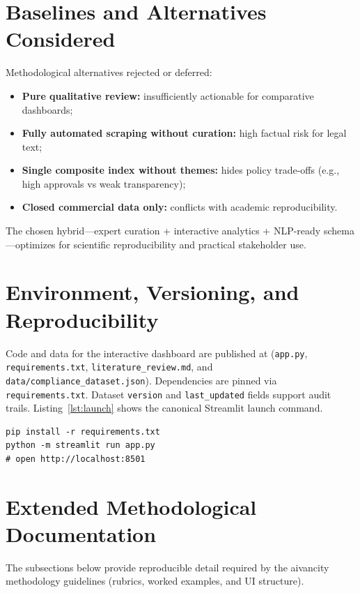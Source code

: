 \section{Baselines and Alternatives Considered}
\label{sec:baselines}

Methodological alternatives rejected or deferred:
\begin{itemize}[noitemsep]
  \item \textbf{Pure qualitative review:} insufficiently actionable for comparative dashboards;
  \item \textbf{Fully automated scraping without curation:} high factual risk for legal text;
  \item \textbf{Single composite index without themes:} hides policy trade-offs (e.g., high approvals vs weak transparency);
  \item \textbf{Closed commercial data only:} conflicts with academic reproducibility.
\end{itemize}
The chosen hybrid---expert curation + interactive analytics + NLP-ready schema---optimizes for scientific reproducibility and practical stakeholder use.

\section{Environment, Versioning, and Reproducibility}
\label{sec:repro}

Code and data for the interactive dashboard are published at
\newline\noindent\repoLink{}
(\texttt{app.py}, \texttt{requirements.txt}, \texttt{literature\_review.md}, and \texttt{data/compliance\_dataset.json}).
Dependencies are pinned via \texttt{requirements.txt}. Dataset \texttt{version} and \texttt{last\_updated} fields support audit trails. Listing~\ref{lst:launch} shows the canonical Streamlit launch command.

\begin{lstlisting}[caption={Launching the Streamlit compliance dashboard},label={lst:launch}]
pip install -r requirements.txt
python -m streamlit run app.py
# open http://localhost:8501
\end{lstlisting}


\section{Extended Methodological Documentation}
\label{sec:method-extended}

The subsections below provide reproducible detail required by the aivancity methodology guidelines (rubrics, worked examples, and UI structure).

